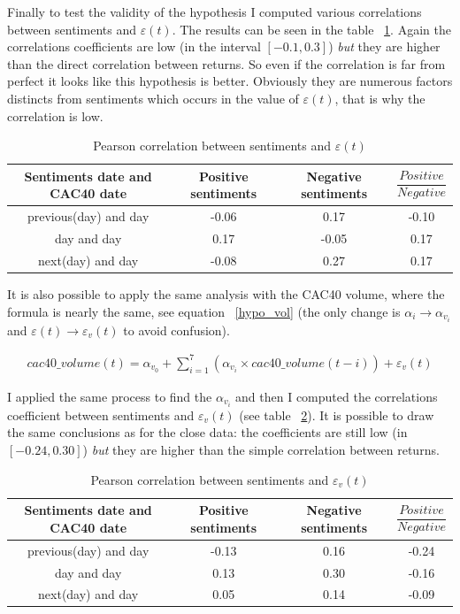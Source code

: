 \documentclass[12pt]{report}
\begin{document}
Finally to test the validity of the hypothesis I computed various correlations between sentiments and $\varepsilon(t)$. The results can be seen in the table ~\ref{pearson_cac_ar}. Again the correlations coefficients are low (in the interval $[-0.1, 0.3]$) \emph{but} they are higher than the direct correlation between returns. So even if the correlation is far from perfect it looks like this hypothesis is better. Obviously they are numerous factors distincts from sentiments which occurs in the value of $\varepsilon(t)$, that is why the correlation is low.

\begin{table}
	\begin{tabular}{|c || c | c | c|}
		\hline
		Sentiments date and CAC40 date & Positive sentiments & Negative sentiments & $\dfrac{Positive}{Negative}$\\
		\hline
		previous(day) and day & -0.06 & 0.17 & -0.10\\
		\hline
		day and day & 0.17 & -0.05 & 0.17\\
		\hline
		next(day) and day & -0.08 & 0.27 & 0.17\\
		\hline
	\end{tabular}

	\caption{Pearson correlation between sentiments and $\varepsilon(t)$\label{pearson_cac_ar}}
\end{table}

It is also possible to apply the same analysis with the CAC40 volume, where the formula is nearly the same, see equation ~\ref{hypo_vol} (the only change is $\alpha_i \rightarrow \alpha_{v_i}$ and $\varepsilon(t) \rightarrow \varepsilon_v(t)$ to avoid confusion).

\begin{eqnarray}
	cac40\_volume(t) = \alpha_{v_0} + \sum_{i = 1}^{7}\left(\alpha_{v_i}\times{}cac40\_volume(t - i)\right) + \varepsilon_v(t)\label{hypo_vol}
\end{eqnarray}

I applied the same process to find the $\alpha_{v_i}$ and then I computed the correlations coefficient between sentiments and $\varepsilon_v(t)$ (see table ~\ref{pearson_cac_vol_ar}). It is possible to draw the same conclusions as for the close data: the coefficients are still low (in $[-0.24, 0.30]$) \emph{but} they are higher than the simple correlation between returns.

\begin{table}
	\begin{tabular}{|c || c | c | c|}
		\hline
		Sentiments date and CAC40 date & Positive sentiments & Negative sentiments & $\dfrac{Positive}{Negative}$\\
		\hline
		previous(day) and day & -0.13 & 0.16 & -0.24\\
		\hline
		day and day & 0.13 & 0.30 & -0.16\\
		\hline
		next(day) and day & 0.05 & 0.14 & -0.09\\
		\hline
	\end{tabular}

	\caption{Pearson correlation between sentiments and $\varepsilon_v(t)$\label{pearson_cac_vol_ar}}
\end{table}
\end{document}
